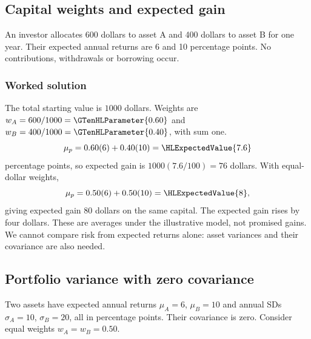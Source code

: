 \subsection{Capital weights and expected gain}\label{prob:sec:general-worked0}
An investor allocates 600 dollars to asset A and 400 dollars to asset B for one year. Their expected annual returns are 6 and 10 percentage points. No contributions, withdrawals or borrowing occur.
\subsubsection*{Worked solution}\label{sol:sec:general-worked0}
The total starting value is $1000$ dollars. Weights are $w_A=600/1000=\GTenHLParameter{0.60}$ and $w_B=400/1000=\GTenHLParameter{0.40}$, with sum one.
\[
\mu_p=0.60(6)+0.40(10)=\HLExpectedValue{7.6}
\]
percentage points, so expected gain is $1000(7.6/100)=76$ dollars. With equal-dollar weights,
\[
\mu_p=0.50(6)+0.50(10)=\HLExpectedValue{8},
\]
giving expected gain $80$ dollars on the same capital. The expected gain rises by four dollars. These are averages under the illustrative model, not promised gains. We cannot compare risk from expected returns alone: asset variances and their covariance are also needed.


\subsection{Portfolio variance with zero covariance}\label{prob:sec:general-worked1}
Two assets have expected annual returns $\mu_A=6$, $\mu_B=10$ and annual SDs $\sigma_A=10$, $\sigma_B=20$, all in percentage points. Their covariance is zero. Consider equal weights $w_A=w_B=0.50$.
